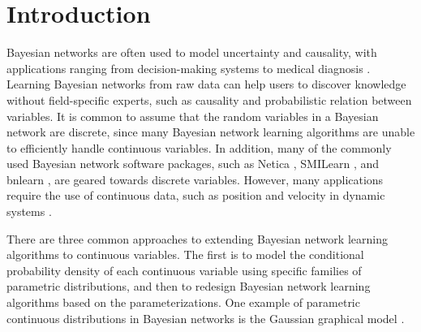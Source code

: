 
\section{Introduction}

Bayesian networks \citep{Pearl_1988, PGM_2009} are often used to model uncertainty and causality, with applications ranging from decision-making systems \citep{kochenderfer2012next} to medical diagnosis \citep{Lustgarten_2011}. Learning Bayesian networks from raw data can help users to discover knowledge without field-specific experts, such as causality and probabilistic relation between variables. It is common to assume that the random variables in a Bayesian network are discrete, since many Bayesian network learning algorithms are unable to efficiently handle continuous variables. In addition, many of the commonly used Bayesian network software packages, such as Netica \citep{netica1992}, SMILearn \citep{druzdzel1999smile}, and bnlearn \citep{bnlearn2010}, are geared towards discrete variables. However, many applications require the use of continuous data, such as position and velocity in dynamic systems \citep{kochenderfer2010airspace}.


There are three common approaches to extending Bayesian network learning algorithms to continuous variables. The first is to model the conditional probability density of each continuous variable using specific families of parametric distributions, and then to redesign Bayesian network learning algorithms based on the parameterizations. One example of parametric continuous distributions in Bayesian networks is the Gaussian graphical model \citep{Weiss_2011}.

